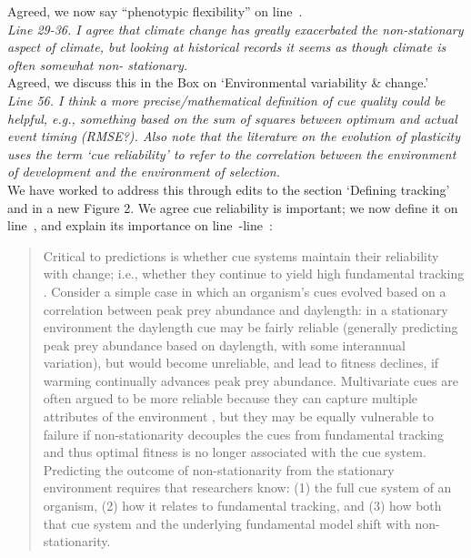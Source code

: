\documentclass[11pt,letterpaper]{article}
\newcommand{\lr}[1]{line~\lineref{#1}}
\begin{document}
Agreed, we now say ``phenotypic flexibility'' on \lr{r4misc2}.\\

\emph{Line 29-36. I agree that climate change has greatly exacerbated the non-stationary aspect of
climate, but looking at historical records it seems as though climate is often somewhat non-
stationary.}\\

Agreed, we discuss this in the Box on `Environmental variability \& change.'\\

\emph{Line 56. I think a more precise/mathematical definition of cue quality could be helpful, e.g., something based on the sum of squares between optimum and actual event timing (RMSE?). Also note that the literature on the evolution of plasticity uses the term `cue reliability'
to refer to the correlation between the environment of development and the environment of
selection.}\\

We have worked to address this through edits to the section `Defining tracking' and in a new Figure 2. We agree cue reliability is important; we now define it on \lr{definecue}, and explain its importance on \lr{cuereliable}-\lr{r3birdsE}:
\begin{quote}
Critical to predictions is whether  cue systems maintain their reliability with change; i.e., whether they continue to yield high fundamental tracking \citep{bonamour2019}. Consider a simple case in which an organism's cues evolved based on a correlation between peak prey abundance and daylength: in a stationary environment the daylength cue may be fairly reliable (generally predicting peak prey abundance based on daylength, with some interannual variation), but would become unreliable, and lead to fitness declines, if warming continually advances peak prey abundance. Multivariate cues are often argued to be more reliable because they can capture multiple attributes of the environment \citep{dore2018,bonamour2019}, but they may be equally vulnerable to failure if non-stationarity decouples the cues from fundamental tracking \citep{bonamour2019} and thus optimal fitness is no longer associated with the cue system. Predicting the outcome of non-stationarity from the stationary environment requires that researchers know: (1) the full cue system of an organism, (2) how it relates to fundamental tracking, and (3) how both that cue system and the underlying fundamental model shift with non-stationarity.
\end{quote}
\end{document}
